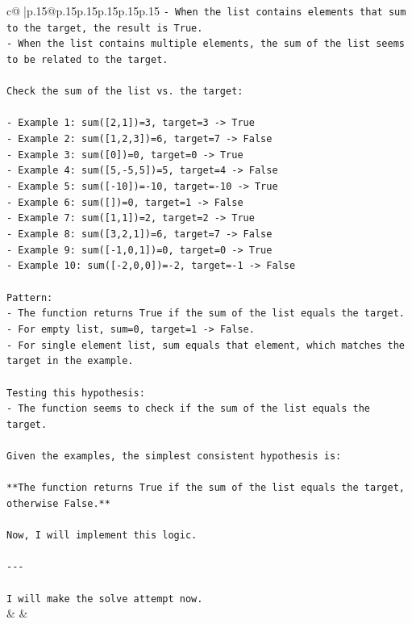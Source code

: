 \documentclass{article}
\begin{document}
{\begin{supertabular}{c@{$\;$}|p{.15\linewidth}@{}p{.15\linewidth}p{.15\linewidth}p{.15\linewidth}p{.15\linewidth}p{.15\linewidth}}
{{{\texttt{{-} When the list contains elements that sum to the target, the result is True.} \\
\texttt{{-} When the list contains multiple elements, the sum of the list seems to be related to the target.} \\
\\ 
\texttt{Check the sum of the list vs. the target:} \\
\\ 
\texttt{{-} Example 1: sum({[}2,1{]})=3, target=3 {-}> True} \\
\texttt{{-} Example 2: sum({[}1,2,3{]})=6, target=7 {-}> False} \\
\texttt{{-} Example 3: sum({[}0{]})=0, target=0 {-}> True} \\
\texttt{{-} Example 4: sum({[}5,{-}5,5{]})=5, target=4 {-}> False} \\
\texttt{{-} Example 5: sum({[}{-}10{]})={-}10, target={-}10 {-}> True} \\
\texttt{{-} Example 6: sum({[}{]})=0, target=1 {-}> False} \\
\texttt{{-} Example 7: sum({[}1,1{]})=2, target=2 {-}> True} \\
\texttt{{-} Example 8: sum({[}3,2,1{]})=6, target=7 {-}> False} \\
\texttt{{-} Example 9: sum({[}{-}1,0,1{]})=0, target=0 {-}> True} \\
\texttt{{-} Example 10: sum({[}{-}2,0,0{]})={-}2, target={-}1 {-}> False} \\
\\ 
\texttt{Pattern:} \\
\texttt{{-} The function returns True if the sum of the list equals the target.} \\
\texttt{{-} For empty list, sum=0, target=1 {-}> False.} \\
\texttt{{-} For single element list, sum equals that element, which matches the target in the example.} \\
\\ 
\texttt{Testing this hypothesis:} \\
\texttt{{-} The function seems to check if the sum of the list equals the target.} \\
\\ 
\texttt{Given the examples, the simplest consistent hypothesis is:} \\
\\ 
\texttt{**The function returns True if the sum of the list equals the target, otherwise False.**} \\
\\ 
\texttt{Now, I will implement this logic.} \\
\\ 
\texttt{{-}{-}{-}} \\
\\ 
\texttt{I will make the solve attempt now.} \\
            }
        }
    }
    & & \\ \\


\end{supertabular}}
\end{document}
